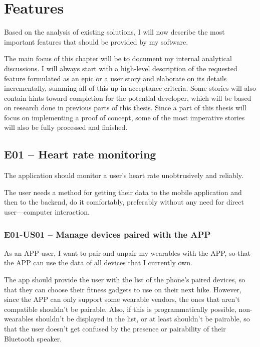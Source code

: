 \section{Features}
Based on the analysis of existing solutions, I will now describe the most important features that should be provided by my software.

The main focus of this chapter will be to document my internal analytical discussions.
I will always start with a high-level description of the requested feature formulated as an epic or a user story and elaborate on its details incrementally, summing all of this up in acceptance criteria.
Some stories will also contain hints toward completion for the potential developer, which will be based on research done in previous parts of this thesis.
Since a part of this thesis will focus on implementing a proof of concept, some of the most imperative stories will also be fully processed and finished.

\subsection*{E01 -- Heart rate monitoring}
The application should monitor a user's heart rate unobtrusively and reliably.

The user needs a method for getting their data to the mobile application and then to the backend, do it comfortably, preferably without any need for direct user---computer interaction.

\subsubsection*{E01-US01 -- Manage devices paired with the APP}
As an APP user, I want to pair and unpair my wearables with the APP, so that the APP can use the data of all devices that I currently own.

The app should provide the user with the list of the phone's paired devices, so that they can choose their fitness gadgets to use on their next hike.
However, since the APP can only support some wearable vendors, the ones that aren't compatible shouldn't be pairable.
Also, if this is programmatically possible, non-wearables shouldn't be displayed in the list, or at least shouldn't be pairable,
so that the user doesn't get confused by the presence or pairability of their Bluetooth speaker.


